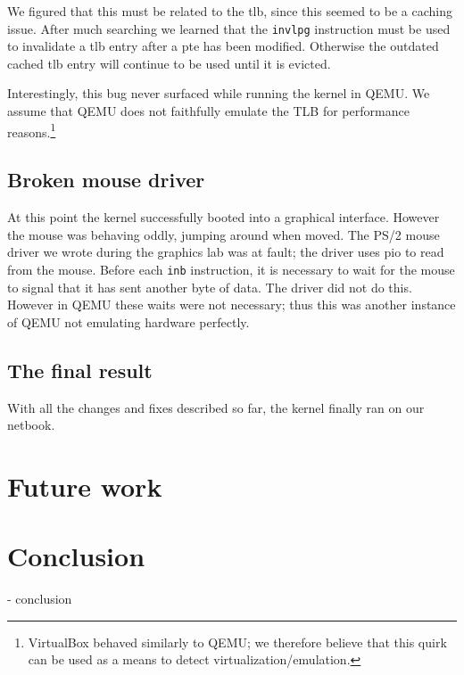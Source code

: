 \documentclass{article}
\begin{document}
We figured that this must be related to the \gls{tlb}, since this seemed to be
a caching issue. After much searching we learned that the \texttt{invlpg}
instruction must be used to invalidate a \gls{tlb} entry after a \gls{pte} has
been modified. Otherwise the outdated cached \gls{tlb} entry will continue to
be used until it is evicted.

Interestingly, this bug never surfaced while running the kernel in QEMU. We
assume that QEMU does not faithfully emulate the TLB for performance
reasons.\footnote{VirtualBox behaved similarly to QEMU; we therefore believe
that this quirk can be used as a means to detect virtualization/emulation.}


\subsection{Broken mouse driver}
At this point the kernel successfully booted into a graphical interface.
However the mouse was behaving oddly, jumping around when moved. The PS/2
mouse driver we wrote during the graphics lab was at fault; the driver uses
\gls{pio} to read from the mouse. Before each \texttt{inb} instruction, it is
necessary to wait for the mouse to signal that it has sent another byte of
data. The driver did not do this. However in QEMU these waits were not
necessary; thus this was another instance of QEMU not emulating hardware
perfectly.


\subsection{The final result}
With all the changes and fixes described so far, the kernel finally ran on our
netbook.




\section{Future work}


\section{Conclusion}
- conclusion
\end{document}
